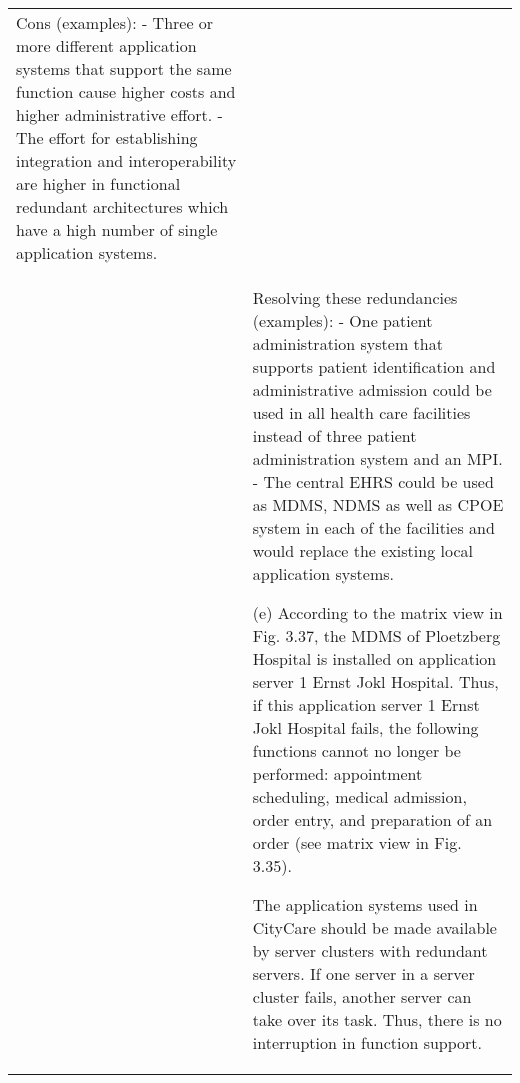 {\begin{landscape}
\begin{longtable}{p{3cm}p{}}
    Cons (examples):
    - Three or more different application systems that support the same function cause higher costs and higher administrative effort.
    - The effort for establishing integration and interoperability are higher in functional redundant architectures which have a high number of single application systems.\\
    & Resolving these redundancies (examples):
    - One patient administration system that supports patient identification and administrative admission could be used in all health care facilities instead of three patient administration system and an MPI.
    - The central EHRS could be used as MDMS, NDMS as well as CPOE system in each of the facilities and would replace the existing local application systems.

    (e) According to the matrix view in Fig. 3.37, the MDMS of Ploetzberg Hospital is installed on application server 1 Ernst Jokl Hospital.
    Thus, if this application server 1 Ernst Jokl Hospital fails, the following functions cannot no longer be performed: appointment scheduling, medical admission, order entry, and preparation of an order (see matrix view in Fig. 3.35).

    The application systems used in CityCare should be made available by server clusters with redundant servers.
    If one server in a server cluster fails, another server can take over its task.
    Thus, there is no interruption in function support.
        

\end{longtable}
\end{landscape}}
